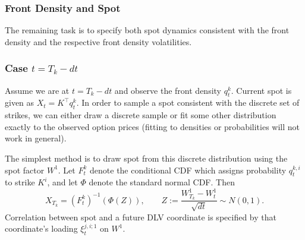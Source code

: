 \documentclass[11pt]{article}
\theoremstyle{plain}
\theoremstyle{definition}
\theoremstyle{remark}
\begin{document}
  \subsubsection{Front Density and Spot}
  \label{sec:front-density}

  The remaining task is to specify both spot dynamics consistent with the front density and the respective front density volatilities.

  \subsubsection*{Case $t=T_k-dt$}

  Assume we are at $t=T_k-dt$ and observe the front density $q_{t}^k$. Current spot is given as $X_t = K^\top q_t^k$.
  In order to sample a spot consistent with the discrete set of strikes, we can either draw a discrete sample or fit some other distribution exactly to the observed option prices (fitting to densities or probabilities will not work in general).

  The simplest method is to draw spot from this discrete distribution using
  the spot factor $W^1$. Let $F_t^k$ denote the conditional CDF which assigns
  probability $q_t^{k,i}$ to strike $K^i$, and let $\Phi$ denote the standard
  normal CDF. Then
  \[
    X_{T_k}=(F_t^k)^{-1}\!\left(\Phi(Z)\right),
    \qquad
    Z:=\frac{W_{T_k}^1-W_t^1}{\sqrt{dt}}\sim N(0,1).
  \]
  Correlation between spot and a future DLV coordinate is specified by that
  coordinate's loading $\xi_t^{j,i;1}$ on $W^1$.
\end{document}

